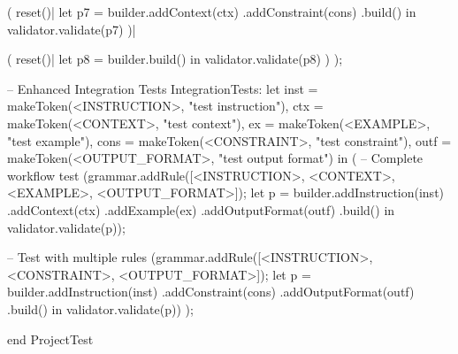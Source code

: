 \documentclass[a4paper]{article}
\begin{document}
\begin{vdm_al}
        (
            reset()|
            let p7 = builder.addContext(ctx)
                            .addConstraint(cons)
                            .build() in
            validator.validate(p7)
        )|

        (
            reset()|
            let p8 = builder.build() in
            validator.validate(p8)
        )
    );

    -- Enhanced Integration Tests
    IntegrationTests:
        let inst = makeToken(<INSTRUCTION>, "test instruction"),
            ctx = makeToken(<CONTEXT>, "test context"),
            ex = makeToken(<EXAMPLE>, "test example"),
            cons = makeToken(<CONSTRAINT>, "test constraint"),
            outf = makeToken(<OUTPUT_FORMAT>, "test output format") in
        (
            -- Complete workflow test
            (grammar.addRule([<INSTRUCTION>, <CONTEXT>, <EXAMPLE>, <OUTPUT_FORMAT>]);
             let p = builder.addInstruction(inst)
                          .addContext(ctx)
                          .addExample(ex)
                          .addOutputFormat(outf)
                          .build() in
             validator.validate(p));

            -- Test with multiple rules
            (grammar.addRule([<INSTRUCTION>, <CONSTRAINT>, <OUTPUT_FORMAT>]);
             let p = builder.addInstruction(inst)
                          .addConstraint(cons)
                          .addOutputFormat(outf)
                          .build() in
             validator.validate(p))
        );

end ProjectTest
\end{vdm_al}
\end{document}

